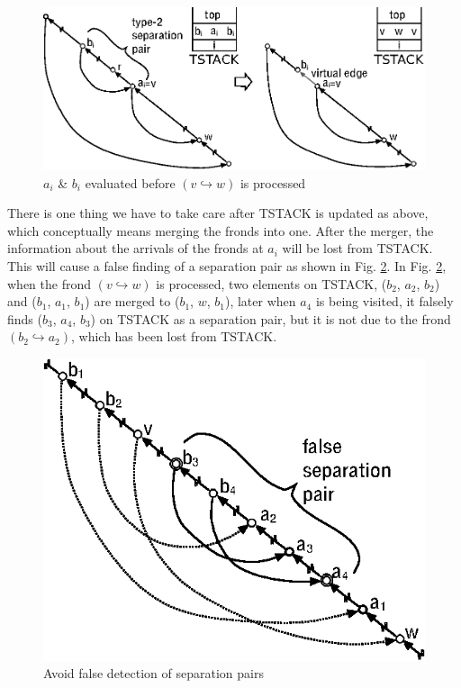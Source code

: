 \documentclass[twoside,twocolumn]{article}
\begin{document}
\begin{figure}[!htb]
\centering
\includegraphics[scale=0.6]{spqr_fig6.eps}
\caption{$a_i$ \& $b_i$ evaluated before $(v \hookrightarrow w)$ is processed}
\label{fig:fig6}
\end{figure}

There is one thing we have to take care after {\ttfamily TSTACK} is updated as above, which
conceptually means merging the fronds into one. After the merger, the
information about the arrivals of the fronds at $a_i$ will be lost from {\ttfamily TSTACK}.
This will cause a false finding of a separation pair as shown in Fig. \ref{fig:fig7}.
In Fig. \ref{fig:fig7}, when the frond $(v \hookrightarrow w)$ is processed, two elements on {\ttfamily TSTACK},
 ($b_2$, $a_2$, $b_2$) and ($b_1$, $a_1$, $b_1$) are merged to ($b_1$, $w$, $b_1$), later
when $a_4$ is being visited, it falsely finds ($b_3$, $a_4$,  $b_3$) on {\ttfamily TSTACK} as
a separation pair, but it is not due to the frond $(b_2 \hookrightarrow a_2)$,
which has been lost from {\ttfamily TSTACK}.

\begin{figure}[!htb]
\centering
\includegraphics[scale=1.0]{spqr_fig7.eps}
\caption{Avoid false detection of separation pairs}
\label{fig:fig7}
\end{figure}
\end{document}
